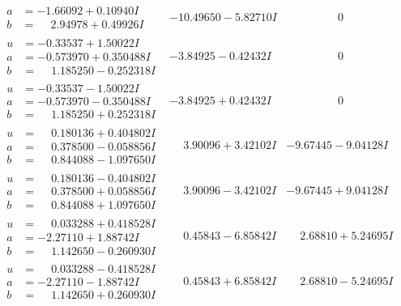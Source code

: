 \documentclass[1p]{elsarticle_modified}
\theoremstyle{definition}
\begin{document}
$$\begin{array}{c|c|c}
\begin{aligned}
a &= -1.66092 + 0.10940 I \\
b &= \phantom{-}2.94978 + 0.49926 I\end{aligned}
 & -10.49650 - 5.82710 I & \phantom{-0.000000 } 0 \\ \hline\begin{aligned}
u &= -0.33537 + 1.50022 I \\
a &= -0.573970 + 0.350488 I \\
b &= \phantom{-}1.185250 - 0.252318 I\end{aligned}
 & -3.84925 - 0.42432 I & \phantom{-0.000000 } 0 \\ \hline\begin{aligned}
u &= -0.33537 - 1.50022 I \\
a &= -0.573970 - 0.350488 I \\
b &= \phantom{-}1.185250 + 0.252318 I\end{aligned}
 & -3.84925 + 0.42432 I & \phantom{-0.000000 } 0 \\ \hline\begin{aligned}
u &= \phantom{-}0.180136 + 0.404802 I \\
a &= \phantom{-}0.378500 - 0.058856 I \\
b &= \phantom{-}0.844088 - 1.097650 I\end{aligned}
 & \phantom{-}3.90096 + 3.42102 I & -9.67445 - 9.04128 I \\ \hline\begin{aligned}
u &= \phantom{-}0.180136 - 0.404802 I \\
a &= \phantom{-}0.378500 + 0.058856 I \\
b &= \phantom{-}0.844088 + 1.097650 I\end{aligned}
 & \phantom{-}3.90096 - 3.42102 I & -9.67445 + 9.04128 I \\ \hline\begin{aligned}
u &= \phantom{-}0.033288 + 0.418528 I \\
a &= -2.27110 + 1.88742 I \\
b &= \phantom{-}1.142650 - 0.260930 I\end{aligned}
 & \phantom{-}0.45843 - 6.85842 I & \phantom{-}2.68810 + 5.24695 I \\ \hline\begin{aligned}
u &= \phantom{-}0.033288 - 0.418528 I \\
a &= -2.27110 - 1.88742 I \\
b &= \phantom{-}1.142650 + 0.260930 I\end{aligned}
 & \phantom{-}0.45843 + 6.85842 I & \phantom{-}2.68810 - 5.24695 I \\ \hline\begin{aligned}

\end{aligned}
\end{array}$$
\end{document}

